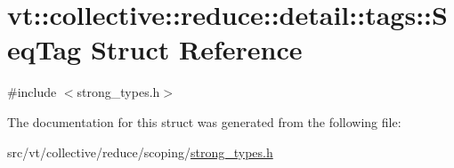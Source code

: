 \hypertarget{structvt_1_1collective_1_1reduce_1_1detail_1_1tags_1_1_seq_tag}{}\section{vt\+:\+:collective\+:\+:reduce\+:\+:detail\+:\+:tags\+:\+:Seq\+Tag Struct Reference}
\label{structvt_1_1collective_1_1reduce_1_1detail_1_1tags_1_1_seq_tag}


{\ttfamily \#include $<$strong\+\_\+types.\+h$>$}



The documentation for this struct was generated from the following file\+:\begin{DoxyCompactItemize}
\item 
src/vt/collective/reduce/scoping/\hyperlink{strong__types_8h}{strong\+\_\+types.\+h}\end{DoxyCompactItemize}
